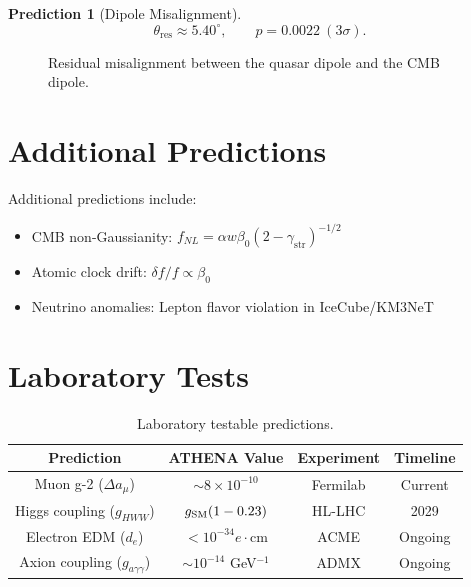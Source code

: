 \documentclass[12pt,oneside]{book}
\newtheorem{prediction}{Prediction}[chapter]
\begin{document}
\begin{prediction}[Dipole Misalignment]
\[
\theta_{\text{res}} \approx 5.40^\circ, \qquad p = 0.0022 \ (3\sigma).
\]
\end{prediction}

\begin{figure}[H]
\centering
{}
\caption{Residual misalignment between the quasar dipole and the CMB dipole.}
\label{fig:dipole}
\end{figure}

\section{Additional Predictions}

Additional predictions include:
\begin{itemize}
    \item CMB non-Gaussianity: $f_{NL} = \alpha w \beta_0 (2 - \gamma_{\text{str}})^{-1/2}$
    \item Atomic clock drift: $\delta f/f \propto \beta_0$
    \item Neutrino anomalies: Lepton flavor violation in IceCube/KM3NeT
\end{itemize}

\section{Laboratory Tests}

\begin{table}[H]
\centering
\begin{tabular}{|c|c|c|c|}
\hline
\textbf{Prediction} & \textbf{ATHENA Value} & \textbf{Experiment} & \textbf{Timeline} \\
\hline
Muon g-2 ($\Delta a_\mu$) & $\sim 8 \times 10^{-10}$ & Fermilab & Current \\
Higgs coupling ($g_{HWW}$) & $g_{\rm SM}(1 - 0.23)$ & HL-LHC & 2029 \\
Electron EDM ($d_e$) & $< 10^{-34} e\cdot\text{cm}$ & ACME & Ongoing \\
Axion coupling ($g_{a\gamma\gamma}$) & $\sim 10^{-14}$ GeV$^{-1}$ & ADMX & Ongoing \\
\hline
\end{tabular}
\caption{Laboratory testable predictions.}
\end{table}
\end{document}
